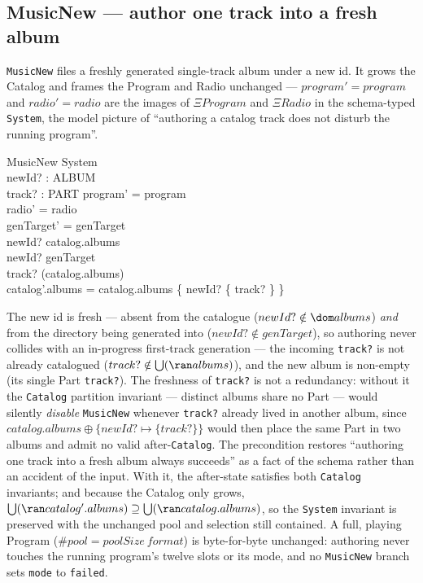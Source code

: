\documentclass[a4paper,10pt,fleqn]{article}
\begin{document}
\subsection{MusicNew --- author one track into a fresh album}

\texttt{MusicNew} files a freshly generated single-track album under a new id. It
grows the Catalog and frames the Program and Radio unchanged
--- $program' = program$ and $radio' = radio$ are the images of \texttt{$\Xi
Program$} and \texttt{$\Xi Radio$} in the schema-typed \texttt{System}, the model
picture of ``authoring a catalog track does not disturb the running program''.

\begin{schema}{MusicNew}
  \Delta System \\
  newId? : ALBUM \\
  track? : PART
  \where
  program' = program \\
  radio' = radio \\
  genTarget' = genTarget \\
  newId? \notin \dom catalog.albums \\
  newId? \notin genTarget \\
  track? \notin \bigcup (\ran catalog.albums) \\
  catalog'.albums = catalog.albums \oplus \{ newId? \mapsto \{ track? \} \}
\end{schema}

The new id is fresh --- absent from the catalogue ($newId? \notin \dom albums$)
\emph{and} from the directory being generated into ($newId? \notin genTarget$),
so authoring never collides with an in-progress first-track generation --- the
incoming \texttt{track?} is not already catalogued
($track? \notin \bigcup (\ran albums)$), and the new album is non-empty (its
single Part \texttt{track?}). The freshness of
\texttt{track?} is not a redundancy: without it the \texttt{Catalog} partition
invariant --- distinct albums share no Part --- would silently \emph{disable}
\texttt{MusicNew} whenever \texttt{track?} already lived in another album, since
$catalog.albums \oplus \{newId? \mapsto \{track?\}\}$ would then place the same
Part in two albums and admit no valid after-\texttt{Catalog}. The precondition
restores ``authoring one track into a fresh album always succeeds'' as a fact of
the schema rather than an accident of the input. With it, the after-state
satisfies both \texttt{Catalog} invariants; and because the Catalog only grows,
$\bigcup (\ran catalog'.albums) \supseteq \bigcup (\ran catalog.albums)$, so the
\texttt{System} invariant is preserved with the unchanged pool and selection
still contained. A full, playing Program ($\# pool = poolSize~format$) is
byte-for-byte unchanged: authoring never touches the running program's twelve
slots or its mode, and no \texttt{MusicNew} branch sets \texttt{mode} to
\texttt{failed}.
\end{document}

